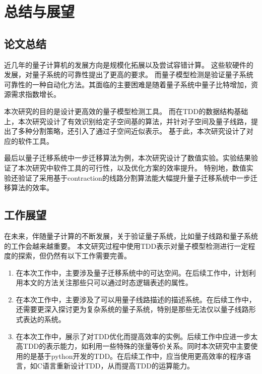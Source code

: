 \chapter{总结与展望}
\section{论文总结}
近几年的量子计算机的发展方向是规模化拓展以及尝试容错计算。
这些软硬件的发展，对量子系统的可靠性提出了更高的要求。
而量子模型检测是验证量子系统可靠性的一种自动化方法。其面临的主要困难是随着量子系统中量子比特增加，资源需求指数增长。

本次研究的目的是设计更高效的量子模型检测工具。
而在TDD的数据结构基础上，本次研究设计了有效识别给定子空间基的算法，并针对子空间及量子线路，提出了多种分割策略，还引入了通过子空间近似表示。
基于此，本次研究设计了对应的软件工具。

最后以量子迁移系统中一步迁移算法为例，本次研究设计了数值实验。实验结果验证了本次研究中软件工具的可行性，以及优化方案的效率提升。
特别地，数值实验还验证了采用基于contraction的线路分割算法能大幅提升量子迁移系统中一步迁移算法的效率。


\section{工作展望}

在未来，伴随量子计算的不断发展，关于验证量子系统，比如量子线路和量子系统的工作会越来越重要。
本文研究过程中使用TDD表示对量子模型检测进行一定程度的探索，但仍然有以下工作需要完善。
\begin{enumerate}
    \item 在本次工作中，主要涉及量子迁移系统中的可达空间。在后续工作中，计划利用本文的方法关注那些只可以通过时态逻辑表述的属性。
    \item 在本次工作中，主要涉及了可以用量子线路描述的描述系统。在后续工作中，还需要更深入探讨更为复杂系统的量子系统，特别是那些无法仅以量子线路形式表达的系统。
    \item 在本次工作中，展示了对TDD优化而提高效率的实例。后续工作中应进一步太高TDD的表示能力，如利用一些特殊的张量等价关系。同时本次研究中主要使用的是基于python开发的TDD。在后续工作中，应当使用更高效率的程序语言，如C语言重新设计TDD，从而提高TDD的运算能力。
\end{enumerate}

